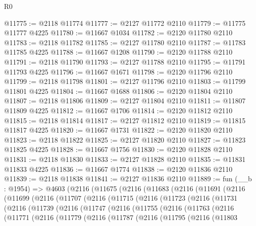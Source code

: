 \begin{lexlean}{R0}
\begin{coremodule}
@11775 := @2118 @11774
@11777 := @2127 @11772 @2110
@11779 := @11775 @11777 @4225
@11780 := @11667 @1034
@11782 := @2120 @11780 @2110
@11783 := @2118 @11782
@11785 := @2127 @11780 @2110
@11787 := @11783 @11785 @4225
@11788 := @11667 @1208
@11790 := @2120 @11788 @2110
@11791 := @2118 @11790
@11793 := @2127 @11788 @2110
@11795 := @11791 @11793 @4225
@11796 := @11667 @1671
@11798 := @2120 @11796 @2110
@11799 := @2118 @11798
@11801 := @2127 @11796 @2110
@11803 := @11799 @11801 @4225
@11804 := @11667 @1688
@11806 := @2120 @11804 @2110
@11807 := @2118 @11806
@11809 := @2127 @11804 @2110
@11811 := @11807 @11809 @4225
@11812 := @11667 @1706
@11814 := @2120 @11812 @2110
@11815 := @2118 @11814
@11817 := @2127 @11812 @2110
@11819 := @11815 @11817 @4225
@11820 := @11667 @1731
@11822 := @2120 @11820 @2110
@11823 := @2118 @11822
@11825 := @2127 @11820 @2110
@11827 := @11823 @11825 @4225
@11828 := @11667 @1756
@11830 := @2120 @11828 @2110
@11831 := @2118 @11830
@11833 := @2127 @11828 @2110
@11835 := @11831 @11833 @4225
@11836 := @11667 @1774
@11838 := @2120 @11836 @2110
@11839 := @2118 @11838
@11841 := @2127 @11836 @2110
@11889 := fun (__b : @1954) =>
  @4603
    (@2116
      (@11675
        (@2116
          (@11683
            (@2116
              (@11691
                (@2116
                  (@11699
                    (@2116
                      (@11707
                        (@2116
                          (@11715
                            (@2116
                              (@11723
                                (@2116
                                  (@11731
                                    (@2116
                                      (@11739
                                        (@2116
                                          (@11747
                                            (@2116
                                              (@11755
                                                (@2116
                                                  (@11763
                                                    (@2116
                                                      (@11771
                                                        (@2116
                                                          (@11779
                                                            (@2116
                                                              (@11787
                                                                (@2116
                                                                  (@11795
                                                                    (@2116
                                                                      (@11803

\end{coremodule}
\end{lexlean}
